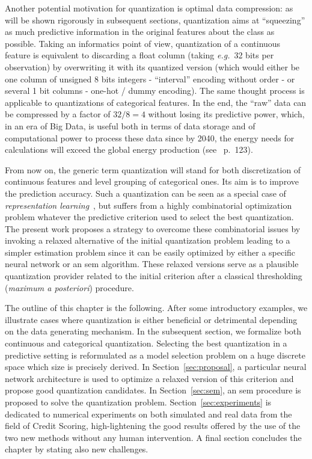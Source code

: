 Another potential motivation for quantization is optimal data compression: as will be shown rigorously in subsequent sections, quantization aims at ``squeezing'' as much predictive information in the original features about the class as possible. Taking an informatics point of view, quantization of a continuous feature is equivalent to discarding a float column (taking \textit{e.g.}\ 32 bits per observation) by overwriting it with its quantized version (which would either be one column of unsigned 8 bits integers - ``interval'' encoding without order - or several 1 bit columns - one-hot / dummy encoding). The same thought process is applicable to quantizations of categorical features. In the end, the ``raw'' data can be compressed by a factor of $32 / 8 = 4$ without losing its predictive power, which, in an era of Big Data, is useful both in terms of data storage and of computational power to process these data since by 2040, the energy needs for calculations will exceed the global energy production (see~\cite{villani2018donner} p.\ 123).

From now on, the generic term quantization will stand for both discretization of continuous features and level grouping of categorical ones. Its aim is to improve the prediction accuracy. Such a quantization can be seen as a special case of \textit{representation learning}~\cite{bengio2013representation}, but suffers from a highly combinatorial optimization problem whatever the predictive criterion used to select the best quantization. The present work proposes a strategy to overcome these combinatorial issues by invoking a relaxed alternative of the initial quantization problem leading to a simpler estimation problem since it can be easily optimized by either a specific neural network or an \gls{sem} algorithm. These relaxed versions serve as a plausible quantization provider related to the initial criterion after a classical thresholding (\textit{maximum a posteriori}) procedure.

The outline of this chapter is the following. After some introductory examples, we illustrate cases where quantization is either beneficial or detrimental depending on the data generating mechanism. In the subsequent section, we formalize both continuous and categorical quantization. Selecting the best quantization in a predictive setting is reformulated as a model selection problem on a huge discrete space which size is precisely derived. In Section~\ref{sec:proposal}, a particular neural network architecture is used to optimize a relaxed version of this criterion and propose good quantization candidates. In Section~\ref{sec:sem}, an \gls{sem} procedure is proposed to solve the quantization problem. Section~\ref{sec:experiments} is dedicated to numerical experiments on both simulated and real data from the field of Credit Scoring, high-lightening the good results offered by the use of the two new methods without any human intervention. A final section concludes the chapter by stating also new challenges.

